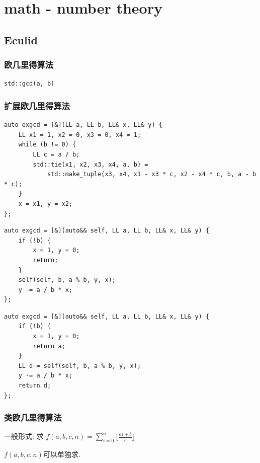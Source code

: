 \documentclass[UTF8, a4paper, titlepage, twoside]{ctexart}
\begin{document}
\newpage
\section{ math - number theory }
\subsection{ Eculid }
\subsubsection*{ 欧几里得算法 }

\begin{lstlisting}[style=cpp]
std::gcd(a, b)
\end{lstlisting}

\subsubsection*{ 扩展欧几里得算法 }

\begin{lstlisting}[style=cpp]
auto exgcd = [&](LL a, LL b, LL& x, LL& y) {
    LL x1 = 1, x2 = 0, x3 = 0, x4 = 1;
    while (b != 0) {
        LL c = a / b;
        std::tie(x1, x2, x3, x4, a, b) =
            std::make_tuple(x3, x4, x1 - x3 * c, x2 - x4 * c, b, a - b * c);
    }
    x = x1, y = x2;
};
\end{lstlisting}

\begin{lstlisting}[style=cpp]
auto exgcd = [&](auto&& self, LL a, LL b, LL& x, LL& y) {
    if (!b) {
        x = 1, y = 0;
        return;
    }
    self(self, b, a % b, y, x);
    y -= a / b * x;
};
\end{lstlisting}

\begin{lstlisting}[style=cpp]
auto exgcd = [&](auto&& self, LL a, LL b, LL& x, LL& y) {
    if (!b) {
        x = 1, y = 0;
        return a;
    }
    LL d = self(self, b, a % b, y, x);
    y -= a / b * x;
    return d;
};
\end{lstlisting}

\subsubsection*{ 类欧几里得算法 }

一般形式: 求 $f(a, b, c, n) = \sum\limits_{i = 0}^{n}\lfloor{\frac{ai+b}{c}}\rfloor$​

$f(a, b, c, n)$​ 可以单独求.
\end{document}

